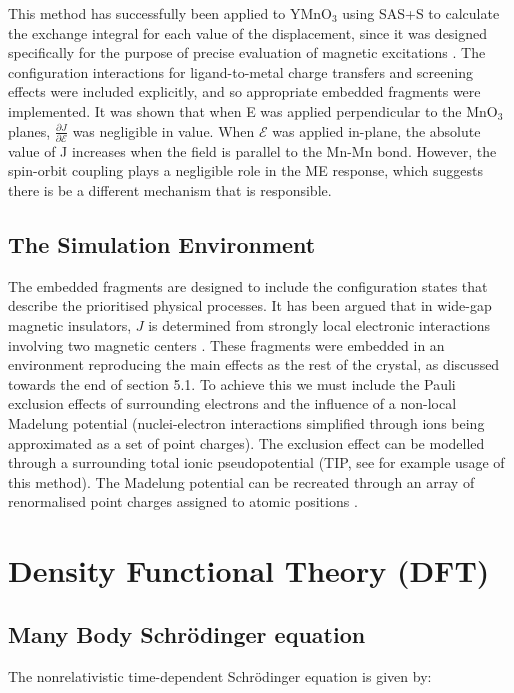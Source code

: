 \documentclass[10pt]{article}
\begin{document}
This method has successfully been applied to YMnO$_3$ using SAS+S to calculate the exchange integral for each value of the displacement, since it was designed specifically for the purpose of precise evaluation of magnetic excitations \cite{varignon2013ab}. The configuration interactions for ligand-to-metal charge transfers and screening effects were included explicitly, and so appropriate embedded fragments were implemented. It was shown that when E was applied perpendicular to the MnO$_3$ planes, $\frac{\partial J}{\partial \mathcal{E}}$  was negligible in value. When $\mathcal{E}$ was applied in-plane, the absolute value of J increases when the field is parallel to the Mn-Mn bond. However, the spin-orbit coupling plays a negligible role in the ME response, which suggests there is be a different mechanism that is responsible.

\subsection{The Simulation Environment}
The embedded fragments are designed to include the configuration states that describe the prioritised physical processes. It has been argued that in wide-gap magnetic insulators, $J$ is determined from strongly local electronic interactions involving two magnetic centers \cite{de1999local}. These fragments were embedded in an environment reproducing the main effects as the rest of the crystal, as discussed towards the end of section 5.1. To achieve this we must include the Pauli exclusion effects of surrounding electrons and the influence of a non-local Madelung potential (nuclei-electron interactions simplified through ions being approximated as a set of point charges). The exclusion effect can be modelled through a surrounding total ionic pseudopotential (TIP, see \cite{winter1987theoretical} for example usage of this method). The Madelung potential can be recreated through an array of renormalised point charges assigned to atomic positions \cite{gelle2008fast}.

\section{Density Functional Theory (DFT)}
\subsection{Many Body Schrödinger equation}
The nonrelativistic time-dependent Schrödinger equation is given by:
\end{document}
